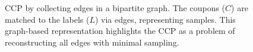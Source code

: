 \begin{figure}
    

\caption{\footnotesize
CCP by collecting edges in a bipartite graph. The coupons (\(C\)) are matched to the labels (\(L\)) via edges, representing samples. This graph-based representation highlights the CCP as a problem of reconstructing all edges with minimal sampling.\label{fig:graph_reduction}
}
\vspace{-4ex}
\end{figure}